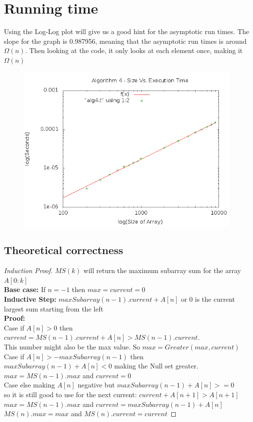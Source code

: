 \documentclass[a4paper,10pt]{article}
\begin{document}
	\section{Running time}
		Using the Log-Log plot will give us a good hint for the asymptotic run times.  
		The slope for the graph is 0.987956, meaning that the asymptotic run times is around $\Omega(n)$. 
		Then looking at the code, it only looks at each element once, making it $\Omega(n)$
		\begin{figure}[!htb]
			\centering
			\includegraphics[scale=.5]{timingfiles/alg4plotlog.png}
		\end{figure}
\begin{samepage} 
	\section{Theoretical correctness}
		\begin{proof}[Induction Proof]
			$MS(k)$ will return the maximum subarray sum for the array $A[0:k]$\\
			\textbf{Base case:} If $n = -1$ then $max = current = 0$\\
			\textbf{Inductive Step:} $maxSubarray(n-1).current + A[n]$ or 0 is the current largest sum starting from the left\\
			\textbf{Proof:}\\ 
			Case if $A[n] > 0$ then $current = MS(n-1).current + A[n] > MS(n-1).current$. \\
			\indent This number might also be the max value. So $max = Greater(max,current)$\\
			Case if $A[n] >  - maxSubarray(n-1)$ then $maxSubarray(n-1) + A[n] < 0$ making the Null set greater.\\
			\indent $max = MS(n-1).max$ and $current = 0$ \\
			Case else making $A[n]$ negative but $maxSubarray(n-1) + A[n] >= 0$\\
			\indent so it is still good to use for the next current: $current + A[n+1] > A[n+1]$\\
			\indent $max = MS(n-1).max$ and $current = maxSubarray(n-1) + A[n]$\\
			$MS(n).max = max$ and $MS(n).current = current$
			 
		\end{proof}
\end{samepage} 
\end{document}
